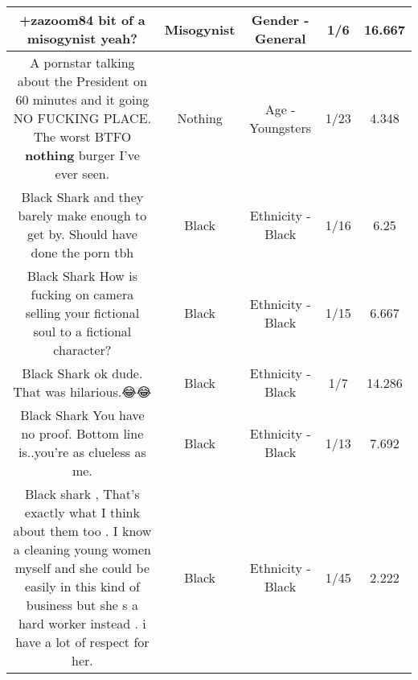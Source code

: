 \documentclass[11pt]{article}
\newlength\mylength
\begin{document}
\begin{center}
\begin{longtable}{|C{.65\mylength}|C{.30\mylength}|C{.12\mylength}|C{.12\mylength}|C{.12\mylength}|}
  \small +zazoom84 bit of a \textbf{misogynist} yeah?\normalsize   & Misogynist & Gender - General & 1/6 & 16.667 \\  \hline
  \small A pornstar talking about the President on 60 minutes and it going NO FUCKING PLACE.  The worst BTFO \textbf{nothing} burger I've ever seen.\normalsize   & Nothing & Age - Youngsters & 1/23 & 4.348 \\  \hline
  \small Black Shark and they barely make enough to get by. Should have done the porn tbh\normalsize   & Black & Ethnicity - Black & 1/16 & 6.25 \\  \hline
  \small Black Shark How is fucking on camera selling your fictional soul to a fictional character?\normalsize   & Black & Ethnicity - Black & 1/15 & 6.667 \\  \hline
  \small Black Shark ok dude. That was hilarious.😂😂\normalsize   & Black & Ethnicity - Black & 1/7 & 14.286 \\  \hline
  \small Black Shark You have no proof. Bottom line is..you're as clueless as me.\normalsize   & Black & Ethnicity - Black & 1/13 & 7.692 \\  \hline
  \small Black shark , That's exactly what I think about them too . I know a cleaning young women myself and she could be easily in this kind of business but she s a hard worker instead . i have a lot of respect for her.\normalsize   & Black & Ethnicity - Black & 1/45 & 2.222 \\  \hline

\end{longtable}
\end{center}
\end{document}
